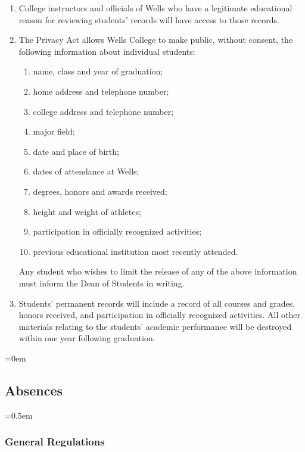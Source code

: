 \documentclass{manual}
\let\oldsubsection\subsection
\renewcommand\subsection{\leftskip=0em\oldsubsection}
\let\oldsubsubsection\subsubsection
\renewcommand\subsubsection{\leftskip=0.5em\oldsubsubsection}
\newcommand{\itemLevelA}{\alph*.}
\newcommand{\itemLevelB}{\arabic*)}
\newcommand{\itemRefA}{\alph*}
\newcommand{\itemRefB}{\arabic*}
\begin{document}
\begin{enumerate}[label=\itemLevelA,ref=\itemRefA]
\begin{enumerate}[label=\itemLevelB,ref=\itemRefB]
\item College instructors and officials of Wells who have a legitimate educational reason for reviewing students' records will have access to those records.

\item The Privacy Act allows Wells College to make public, without consent, the following information about individual students:
\begin{enumerate}[label=\alph*)]
\item name, class and year of graduation;
\item home address and telephone number;
\item college address and telephone number;
\item major field;
\item date and place of birth;
\item dates of attendance at Wells;
\item degrees, honors and awards received;
\item height and weight of athletes;
\item participation in officially recognized activities;
\item previous educational institution most recently attended.
\end{enumerate}

Any student who wishes to limit the release of any of the above information must inform the Dean of Students in writing.

\item Students' permanent records will include a record of all courses and grades, honors received, and participation in officially recognized activities. All other materials relating to the students' academic performance will be destroyed within one year following graduation.

\end{enumerate}
\end{enumerate}




\subsection{Absences}

\subsubsection{General Regulations}
\end{document}

